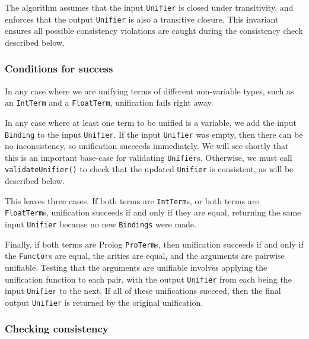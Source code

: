 \documentclass[12pt]{article}
\begin{document}
The algorithm assumes that the input \verb|Unifier| is closed under transitivity, and enforces that the output \verb|Unifier| is also a transitive closure. 
This invariant ensures all possible consistency violations are caught during the consistency check described below.

\subsubsection{Conditions for success}

In any case where we are unifying terms of different non-variable types, such as an \verb|IntTerm| and a \verb|FloatTerm|, unification fails right away. 

In any case where at least one term to be unified is a variable, we add the input \verb|Binding| to the input \verb|Unifier|. 
If the input \verb|Unifier| was empty, then there can be no inconsistency, so unification succeeds immediately. 
We will see shortly that this is an important base-case for validating \verb|Unifier|s. 
Otherwise, we must call \verb|validateUnifier()| to check that the updated \verb|Unifier| is consistent, as will be described below.

This leaves three cases. 
If both terms are \verb|IntTerm|s, or both terms are \verb|FloatTerm|s, unification succeeds if and only if they are equal, returning the same input \verb|Unifier| because no new \verb|Bindings| were made. 

Finally, if both terms are Prolog \verb|ProTerm|s, then unification succeeds if and only if the \verb|Functor|s are equal, the arities are equal, and the arguments are pairwise unifiable. 
Testing that the arguments are unifiable involves applying the unification function to each pair, with the output \verb|Unifier| from each being the input \verb|Unifier| to the next. 
If all of these unifications succeed, then the final output \verb|Unifier| is returned by the original unification.

\subsubsection{Checking consistency}

\end{document}
